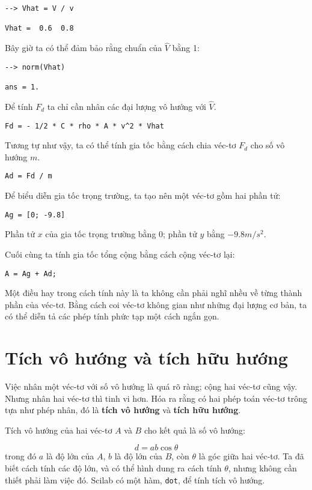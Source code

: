 \documentclass[12pt]{book}
\begin{document}
\begin{verbatim}
--> Vhat = V / v

Vhat =  0.6  0.8
\end{verbatim}
%
Bây giờ ta có thể đảm bảo rằng chuẩn của $\hat{V}$ bằng 1:

\begin{verbatim}
--> norm(Vhat)

ans = 1.
\end{verbatim}
%
Để tính $F_d$ ta chỉ cần nhân các đại lượng vô hướng với $\hat{V}$.

\begin{verbatim}
Fd = - 1/2 * C * rho * A * v^2 * Vhat
\end{verbatim}
%
Tương tự như vậy, ta có thể tính gia tốc bằng cách chia véc-tơ 
$F_d$ cho số vô hướng $m$.

\begin{verbatim}
Ad = Fd / m
\end{verbatim}
%
Để biểu diễn gia tốc trọng trường, ta tạo nên một véc-tơ gồm hai 
phần tử:

\begin{verbatim}
Ag = [0; -9.8]
\end{verbatim}
%
Phần tử  $x$ của gia tốc trọng trường bằng 0; phần tử $y$ bằng $-9.8 m/s^2$.

Cuối cùng ta tính gia tốc tổng cộng bằng cách cộng véc-tơ lại:

\begin{verbatim}
A = Ag + Ad;
\end{verbatim}
%
Một điều hay trong cách tính này là ta không cần phải nghĩ nhều về từng 
thành phần của véc-tơ. Bằng cách coi véc-tơ không gian như những đại lượng 
cơ bản, ta có thể diễn tả các phép tính phức tạp một cách ngắn gọn.


\section{Tích vô hướng và tích hữu hướng}

Việc nhân một véc-tơ với số vô hướng là quá rõ ràng; cộng hai véc-tơ cũng vậy. 
Nhưng nhân hai véc-tơ thì tinh vi hơn. Hóa ra rằng có hai phép toán véc-tơ 
trông tựa như phép nhân, đó là {\bf tích vô hướng} và {\bf tích hữu hướng}.

Tích vô hướng của hai véc-tơ $A$ và $B$ cho kết quả là số vô hướng:

\[ d = a b \cos \theta \]
%
trong đó $a$ là độ lớn của $A$, $b$ là độ lớn của $B$, còn 
$\theta$ là góc giữa hai véc-tơ. Ta đã biết cách tính các độ lớn, và có thể 
hình dung ra cách tính $\theta$, nhưng không cần thiết phải làm việc đó.  
Scilab có một hàm, {\tt dot}, để tính tích vô hướng.
\end{document}
